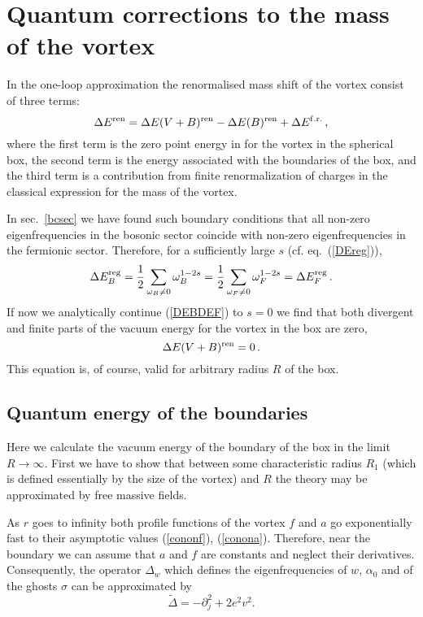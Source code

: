 \documentclass[a4paper,12pt]{article}
\begin{document}
\section{Quantum corrections to the mass of the vortex}\label{masssec}
In the one-loop approximation the renormalised mass shift of the
vortex consist of three terms:
\begin{equation}
\Delta E^{\rm ren} = \Delta E(V+B)^{\rm ren} - \Delta E (B)^{\rm
ren} + \Delta E^{\rm f.r.} \,,\label{DE3DE}
\end{equation}
where the first term is the zero point energy in for the vortex in
the spherical box, the second term is the energy associated with
the boundaries of the box, and the third term is a contribution
from finite renormalization  of charges in the classical
expression for the mass of the vortex.

In sec.\ \ref{bcsec} we have found such boundary conditions that
all non-zero eigenfrequencies in the bosonic sector coincide with
non-zero eigenfrequencies in the fermionic sector. Therefore, for
a sufficiently large $s$ (cf. eq.\ (\ref{DEreg})),
\begin{equation}
\Delta E_B^{\rm reg} = \frac 12 \sum_{\omega_B\ne 0}
\omega_B^{1-2s} =\frac 12 \sum_{\omega_F\ne 0} \omega_F^{1-2s} =
\Delta E_F^{\rm reg} \,.\label{DEBDEF}
\end{equation}
If now we analytically continue (\ref{DEBDEF}) to $s=0$ we find
that both divergent and finite parts of the vacuum energy for the
vortex in the box are zero,
\begin{equation}
\Delta E(V+B)^{\rm ren} =0 \,.\label{1term}
\end{equation}
This equation is, of course, valid for arbitrary radius $R$ of the
box.

\subsection{Quantum energy of the boundaries}
Here we calculate the vacuum energy of the boundary of the box
in the limit $R\to\infty$. First we have to show that between
some characteristic radius $R_1$ (which is defined essentially by
the size of the vortex) and $R$ the theory may be approximated
by free massive fields.

As $r$ goes to infinity both profile functions of the vortex $f$
and $a$ go exponentially fast to their asymptotic values
(\ref{cononf}), (\ref{conona}). Therefore, near the boundary we
can assume that $a$ and $f$ are constants and neglect their
derivatives. Consequently, the operator $\Delta_w$ which defines
the eigenfrequencies of $w$, $\alpha_0$ and of the ghosts $\sigma$
can be approximated by
\begin{equation}
\tilde \Delta =-\partial_j^2 +2e^2v^2.\label{asop}
\end{equation}
\end{document}
